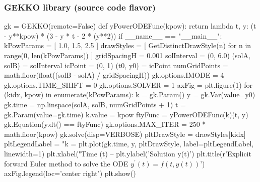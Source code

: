 \documentclass[usenames,svgnames,dvipsnames,10pt]{beamer}
\begin{document}
\begin{frame}[fragile]
\frametitle{GEKKO library (source code flavor)}

\begin{center}
\begin{pythoncodesmall}
gk = GEKKO(remote=False)
def yPowerODEFunc(kpow):
    return lambda t, y: (t - y**kpow) * (3 - y * t - 2 * (y**2))
if __name__ == "__main__":
    kPowParams    = [ 1.0, 1.5, 2.5 ]
    drawStyles    = [ GetDistinctDrawStyle(n) for n in range(0, len(kPowParams)) ]
    gridSpacingH  = 0.001
    solInterval   = (0, 6.0)
    (solA, solB)  = solInterval
    icPoint       = (0, 1)
    (t0, y0)      = icPoint
    numGridPoints = math.floor(float((solB - solA) / gridSpacingH))
    gk.options.IMODE = 4
    gk.options.TIME_SHIFT = 0
    gk.options.SOLVER = 1
    axFig = plt.figure(1)
    for (kidx, kpow) in enumerate(kPowParams):
        k             = gk.Param()
        y             = gk.Var(value=y0)
        gk.time       = np.linspace(solA, solB, numGridPoints + 1)
        t             = gk.Param(value=gk.time)
        k.value       = kpow
        ftyFunc       = yPowerODEFunc(k)(t, y)
        gk.Equation(y.dt() == ftyFunc)
        gk.options.MAX_ITER = 250 * math.floor(kpow) 
        gk.solve(disp=VERBOSE)
        pltDrawStyle = drawStyles[kidx]
        pltLegendLabel = "k = %
        plt.plot(gk.time, y, pltDrawStyle, label=pltLegendLabel, linewidth=1)
    plt.xlabel("Time (t) -- %
    plt.ylabel('Solution y(t)')
    plt.title(r'Explicit forward Euler method to solve the ODE $y^{\prime}(t) = f(t, y(t))$')
    axFig.legend(loc='center right')
    plt.show()
\end{pythoncodesmall}
\end{center}

\end{frame}
\end{document}
